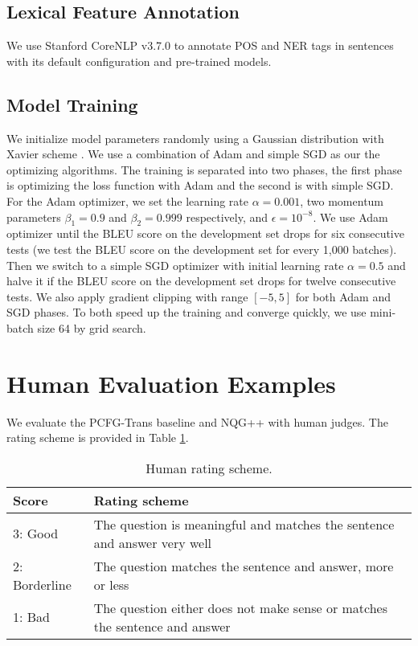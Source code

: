 \documentclass[11pt,letterpaper]{article}
\newcommand{\ourModelName}{NQG}
\begin{document}
\subsection{Lexical Feature Annotation}
We use Stanford CoreNLP v3.7.0 \citep{manning-EtAl:2014:P14-5} to annotate POS and NER tags in sentences with its default configuration and pre-trained models.

\subsection{Model Training}
We initialize model parameters randomly using a Gaussian distribution with Xavier scheme \citep{glorot2010understanding}.
We use a combination of Adam \citep{kingma2014adam} and simple SGD as our the optimizing algorithms.
The training is separated into two phases, the first phase is optimizing the loss function with Adam and the second is with simple SGD.
For the Adam optimizer, we set the learning rate $ \alpha = 0.001 $, two momentum parameters $ \beta_{1} = 0.9 $ and $ \beta_{2} = 0.999 $ respectively, and $ \epsilon=10^{-8} $.
We use Adam optimizer until the BLEU score on the development set drops for six consecutive tests (we test the BLEU score on the development set for every 1,000 batches).
Then we switch to a simple SGD optimizer with initial learning rate $ \alpha=0.5 $ and halve it if the BLEU score on the development set drops for twelve consecutive tests.
We also apply gradient clipping \citep{pascanu2013difficulty} with range $ [-5, 5] $ for both Adam and SGD phases.
To both speed up the training and converge quickly, we use mini-batch size 64 by grid search.


\section{Human Evaluation Examples}
We evaluate the PCFG-Trans baseline and \ourModelName{}++ with human judges.
The rating scheme is provided in Table \ref{tbl:humanEvaStand}.
\begin{table}[htbp]
	\begin{center}
		\begin{tabular}{lp{}}
			\toprule
			Score &  Rating scheme \\
			\midrule
			3: Good & The question is meaningful and matches the sentence and answer very well \\
			\hline
			2: Borderline & The question matches the sentence and answer, more or less \\
			\hline
			1: Bad & The question either does not make sense or matches the sentence and answer \\
			\bottomrule
		\end{tabular}
	\end{center}
	\caption{\label{tbl:humanEvaStand} Human rating scheme.}
\end{table}
\end{document}
